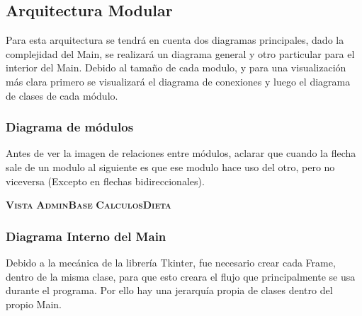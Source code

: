 \subsection{Arquitectura Modular}
Para esta arquitectura se tendrá en cuenta dos diagramas principales, dado la complejidad del Main, se realizará un diagrama general y otro particular para el interior del Main. Debido al tamaño de cada modulo, y para una visualización más clara primero se visualizará el diagrama de conexiones y luego el diagrama de clases de cada módulo.\\
\subsubsection{Diagrama de módulos}
Antes de ver la imagen de relaciones entre módulos, aclarar que cuando la flecha sale de un modulo al siguiente es que ese modulo hace uso del otro, pero no viceversa (Excepto en flechas bidireccionales).

\textbf{\textsc{Vista}}
\textbf{\textsc{AdminBase}}
\textbf{\textsc{CalculosDieta}}
\subsubsection{Diagrama Interno del Main}
Debido a la mecánica de la librería Tkinter, fue necesario crear cada Frame, dentro de la misma clase, para que esto creara el flujo que principalmente se usa durante el programa. Por ello hay una jerarquía propia de clases dentro del propio Main.
